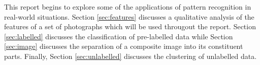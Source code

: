 This report begins to explore some of the applications of pattern recognition
in real-world situations. Section \ref{sec:features} discusses a qualitative
analysis of the features of a set of photographs which will be used througout
the report. Section \ref{sec:labelled} discusses the classification of
pre-labelled data while Section \ref{sec:image} discusses the separation of a
composite image into its constituent parts. Finally, Section
\ref{sec:unlabelled} discusses the clustering of unlabelled data.